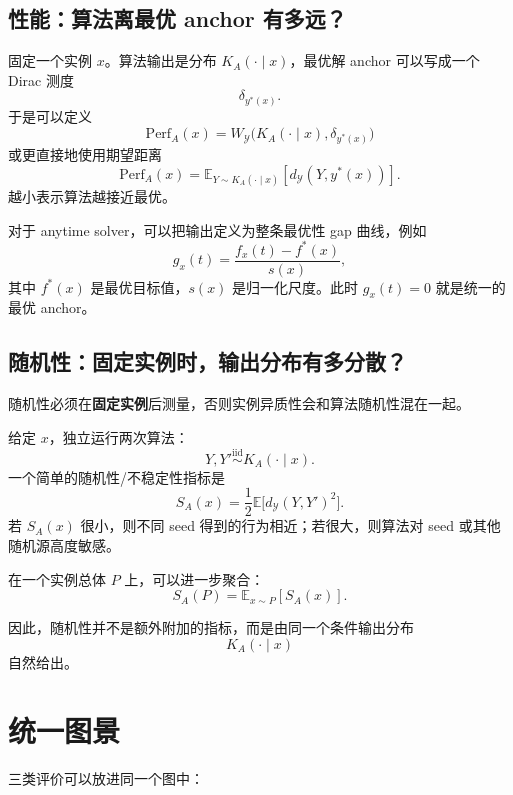 \documentclass[11pt,a4paper]{ctexart}
\begin{document}
\subsection{性能：算法离最优 anchor 有多远？}

固定一个实例 $x$。算法输出是分布 $K_A(\cdot\mid x)$，最优解 anchor 可以写成一个 Dirac 测度
\[
\delta_{y^*(x)}.
\]
于是可以定义
\[
\boxed{
\mathrm{Perf}_A(x)
=
W_{\mathcal Y}
\bigl(K_A(\cdot\mid x),\delta_{y^*(x)}\bigr)
}
\]
或更直接地使用期望距离
\[
\mathrm{Perf}_A(x)
=
\mathbb E_{Y\sim K_A(\cdot\mid x)}
[d_{\mathcal Y}(Y,y^*(x))].
\]
越小表示算法越接近最优。

对于 anytime solver，可以把输出定义为整条最优性 gap 曲线，例如
\[
g_x(t)
=
\frac{f_x(t)-f^*(x)}{s(x)},
\]
其中 $f^*(x)$ 是最优目标值，$s(x)$ 是归一化尺度。此时 $g_x(t)=0$ 就是统一的最优 anchor。

\subsection{随机性：固定实例时，输出分布有多分散？}

随机性必须在\textbf{固定实例}后测量，否则实例异质性会和算法随机性混在一起。

给定 $x$，独立运行两次算法：
\[
Y,Y'\overset{\mathrm{iid}}{\sim}K_A(\cdot\mid x).
\]
一个简单的随机性/不稳定性指标是
\[
\boxed{
S_A(x)
=
\frac12
\mathbb E\bigl[d_{\mathcal Y}(Y,Y')^2\bigr].
}
\]
若 $S_A(x)$ 很小，则不同 seed 得到的行为相近；若很大，则算法对 seed 或其他随机源高度敏感。

在一个实例总体 $P$ 上，可以进一步聚合：
\[
S_A(P)=\mathbb E_{x\sim P}[S_A(x)].
\]

因此，随机性并不是额外附加的指标，而是由同一个条件输出分布
\[
K_A(\cdot\mid x)
\]
自然给出。

\section{统一图景}

三类评价可以放进同一个图中：
\end{document}
